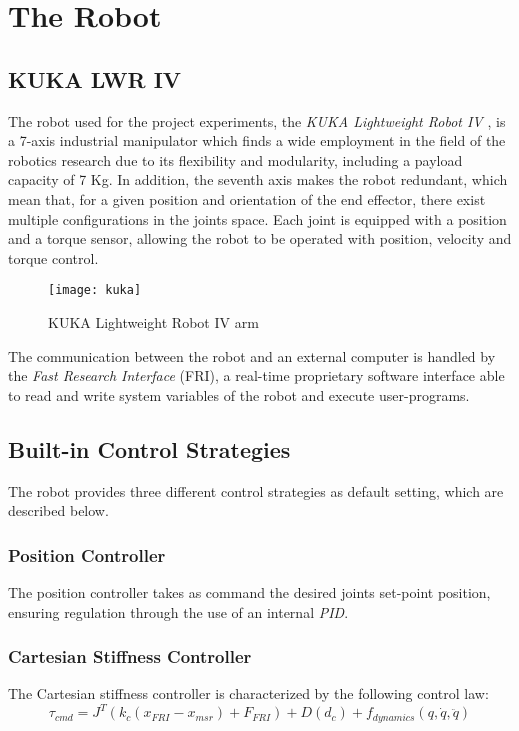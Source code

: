 \section{The Robot}\label{sec:therobot}
\subsection{KUKA LWR IV}

The robot used for the project experiments, the \textit{KUKA Lightweight Robot IV} \cite{webkuka}, is a 7-axis industrial manipulator which finds a wide employment in the field of the robotics research due to its flexibility and modularity, including a payload capacity of 7 Kg. In addition, the seventh axis makes the robot redundant, which mean that, for a given position and orientation of the end effector, there exist multiple configurations in the joints space. Each joint is equipped with a position and a torque sensor, allowing the robot to be operated with position, velocity and torque control. 

\begin{figure}[h]
\centering
\texttt{[image: kuka]}
\caption{KUKA Lightweight Robot IV arm}
\end{figure}

The communication between the robot and an external computer is handled by the \textit{Fast Research Interface} (FRI), a real-time proprietary software interface able to read and write system variables of the robot and execute user-programs.

\subsection{Built-in Control Strategies}
The robot provides three different control strategies as default setting, which are described below.
\subsubsection*{Position Controller}
The position controller takes as command the desired joints set-point position, ensuring regulation through the use of an internal \textit{PID}. 

\subsubsection*{Cartesian Stiffness Controller}
The Cartesian stiffness controller is characterized by the following control law:
\begin{equation}
\tau_{cmd} = J^T(k_c(x_{FRI} - x_{msr}) + F_{FRI}) + D(d_c) + f_{dynamics}(q,\dot{q},\ddot{q})
\label{eq:cartesianstiffnesscontroller}
\end{equation}

